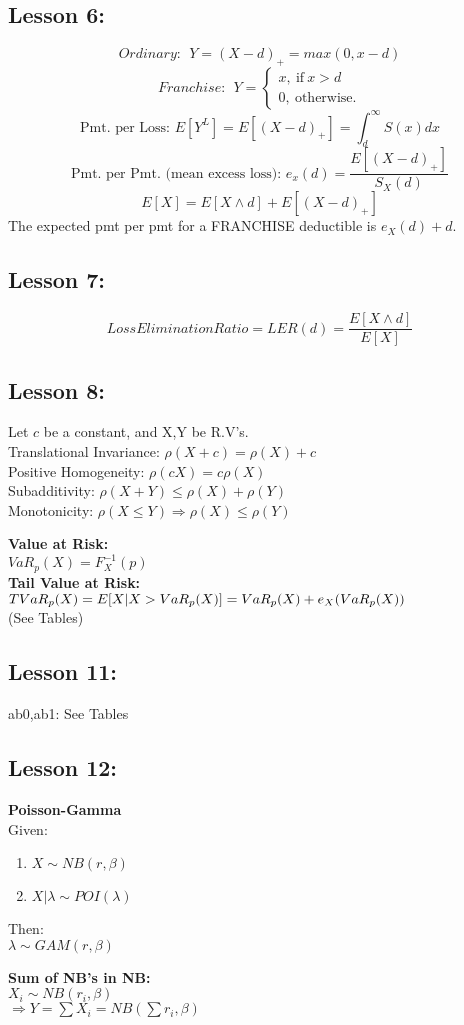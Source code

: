 \documentclass[11pt,twocolumn]{article}
\def\wl{\par \vspace{\baselineskip}}
\def\imply{\Rightarrow}
\begin{document}
\subsection*{Lesson 6:}
  \[ Ordinary:~~Y=(X-d)_+ = max(0,x-d) \]
  \[ Franchise:~~Y=\begin{cases} x,~\text{if}~x>d \\
                                 0,~\text{otherwise.}
                   \end{cases} \]
  \[ \text{Pmt. per Loss: } E[Y^L] = E[(X-d)_+] = \int_d^\infty{S(x)dx} \]
  \[ \text{Pmt. per Pmt. (mean excess loss): } e_x(d) = \frac{E[(X-d)_+]}{S_X(d)} \]
  \[ E[X] = E[X \wedge d] + E[(X-d)_+] \]
  The expected pmt per pmt for a FRANCHISE deductible is $e_X(d) + d$.

\subsection*{Lesson 7:}
  \[ Loss Elimination Ratio = LER(d) = \frac{E[X \wedge d]}{E[X]} \]

\newpage
\subsection*{Lesson 8:}
  Let $c$ be a constant, and X,Y be R.V's. \\
  Translational Invariance: $\rho(X+c) = \rho(X)+c$ \\
  Positive Homogeneity: $\rho(cX) = c\rho(X)$ \\
  Subadditivity: $\rho(X+Y) \le \rho(X)+\rho(Y)$ \\
  Monotonicity: $\rho(X \le Y) \imply \rho(X) \le \rho(Y)$
  \wl\noindent
  \textbf{Value at Risk:} \\
  $VaR_p(X) = F^{-1}_X(p)$ \\
  \textbf{Tail Value at Risk:} \\
  $TVaR_p(X)=E[X|X>VaR_p(X)] \\
  = VaR_p(X) + e_X(VaR_p(X))$ \\
  (See Tables)

\subsection*{Lesson 11:}
  ab0,ab1: See Tables

\subsection*{Lesson 12:}
  \textbf{Poisson-Gamma}\\
  Given:
  \begin{enumerate}
    \item $X \sim NB(r,\beta)$
    \item $X|\lambda \sim POI(\lambda)$
  \end{enumerate}  
  Then:\\ \indent
    $\lambda \sim GAM(r,\beta)$
  \wl\noindent
  \textbf{Sum of NB's in NB:}\\
  $ X_i \sim NB(r_i,\beta) $ \\
  $\imply  Y = \sum{X_i} = NB(\sum{r_i},\beta) $
\end{document}
